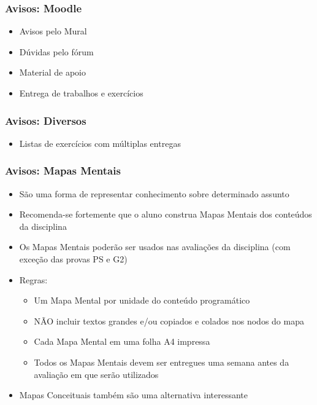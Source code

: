 \documentclass[aspectratio=169]{beamer}
\begin{document}
\begin{frame}\frametitle{Avisos: Moodle}
\begin{itemize}	
	\item Avisos pelo Mural
	\item D\'uvidas pelo f\'orum
	\item Material de apoio
	\item Entrega de trabalhos e exerc\'icios
\end{itemize}
\end{frame}

\begin{frame}\frametitle{Avisos: Diversos}
\begin{itemize}
	\item Listas de exercícios com múltiplas entregas
\end{itemize}
\end{frame}

\begin{frame}\frametitle{Avisos: Mapas Mentais}
\begin{itemize}
	\item São uma forma de representar conhecimento sobre determinado assunto
	\item Recomenda-se fortemente que o aluno construa Mapas Mentais dos conteúdos da disciplina
	\item Os Mapas Mentais poderão ser usados nas avaliações da disciplina (com exceção das provas PS e G2)
	\item Regras:
	\begin{itemize}
		\item Um Mapa Mental por unidade do conteúdo programático
		\item NÃO incluir textos grandes e/ou copiados e colados nos nodos do mapa
		\item Cada Mapa Mental em uma folha A4 impressa
		\item Todos os Mapas Mentais devem ser entregues uma semana antes da avaliação em que serão utilizados
	\end{itemize}
	\item Mapas Conceituais também são uma alternativa interessante
\end{itemize}
\end{frame}
\end{document}
